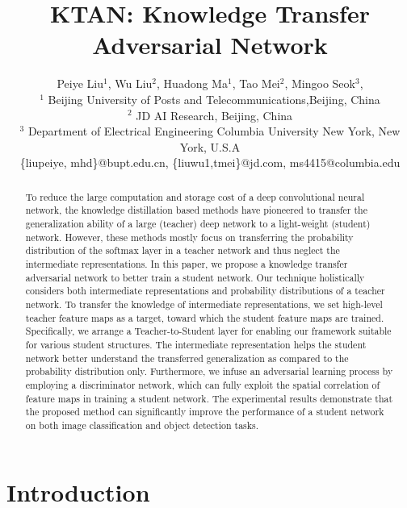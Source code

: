 \documentclass[letterpaper]{article} %
\begin{document}
\title{KTAN: Knowledge Transfer Adversarial Network}
\author{
Peiye Liu$^1$, 
Wu Liu$^2$, 
Huadong Ma$^1$,
Tao Mei$^2$, 
Mingoo Seok$^3$,
\\
$^1$ Beijing University of Posts and Telecommunications,Beijing, China\\
$^2$ JD AI Research, Beijing, China\\
$^3$ Department of Electrical Engineering Columbia University New York, New York, U.S.A  \\
\{liupeiye, mhd\}@bupt.edu.cn,
\{liuwu1,tmei\}@jd.com,
ms4415@columbia.edu
}
\maketitle

\begin{abstract}
	To reduce the large computation and storage cost of a deep convolutional neural network, the knowledge distillation based methods have pioneered to transfer the generalization ability of a large (teacher) deep network to a light-weight (student) network.
	However, these methods mostly focus on transferring the probability distribution of the softmax layer in a teacher network and thus neglect the intermediate representations.
	In this paper, we propose a knowledge transfer adversarial network to better train a student network. Our technique holistically considers both intermediate representations and probability distributions of a teacher network.
	To transfer the knowledge of intermediate representations, we set high-level teacher feature maps as a target, toward which the student feature maps are trained.
	Specifically, we arrange a Teacher-to-Student layer for enabling our framework suitable for various student structures.
	The intermediate representation helps the student network better understand the transferred generalization as compared to the probability distribution only.
	Furthermore, we infuse an adversarial learning process by employing a discriminator network, which can fully exploit the spatial correlation of feature maps in training a student network.
	The experimental results demonstrate that the proposed method can significantly %
	improve the performance of a student network on both image classification and object detection tasks.
\end{abstract}

\section{Introduction}
\end{document}

